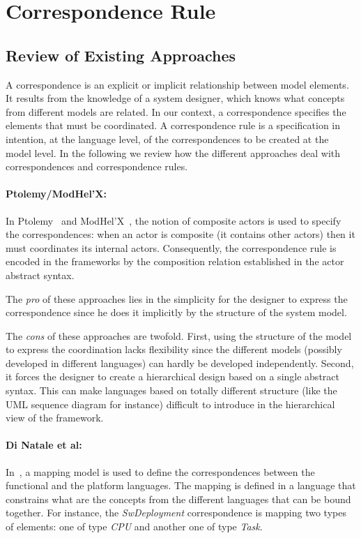 \section{Correspondence Rule}
	\subsection{Review of Existing Approaches}
A correspondence is an explicit or implicit relationship between model elements. It results from the knowledge of a system designer, which knows what concepts from different models are related. In our context, a correspondence specifies the elements that must be coordinated.
A correspondence rule is a specification in intention, at the language level, of the correspondences to be created at the model level. In the following we review how the different approaches deal with correspondences and correspondence rules.

\paragraph{Ptolemy/ModHel'X: }
In Ptolemy~\cite{ptoleframebib} and ModHel'X~\cite{modhelxbib}, the notion of composite actors is used to specify the correspondences: when an actor is composite (\ie it contains other actors) then it must coordinates its internal actors.
Consequently, the correspondence rule is encoded in the frameworks by the composition relation established in the actor abstract syntax.

The \emph{pro} of these approaches lies in the simplicity for the designer to express the correspondence since he does it implicitly by the structure of the system model. 

The \emph{cons} of these approaches are twofold. First, using the structure of the model to express the coordination lacks flexibility since the different models (possibly developed in different languages) can hardly be developed independently. Second, it forces the designer to create a hierarchical design based on a single abstract syntax. This can make languages based on totally different structure (like the UML sequence diagram for instance) difficult to introduce in the hierarchical view of the framework.

\paragraph{Di Natale et al: }
In~\cite{dinatale}, a mapping model is used to define the correspondences between the functional and the platform languages. The mapping is defined in a language that constrains what are the concepts from the different languages that can be bound together. For instance, the \emph{SwDeployment} correspondence is mapping two types of elements: one of type \emph{CPU} and another one of type \emph{Task}. 

